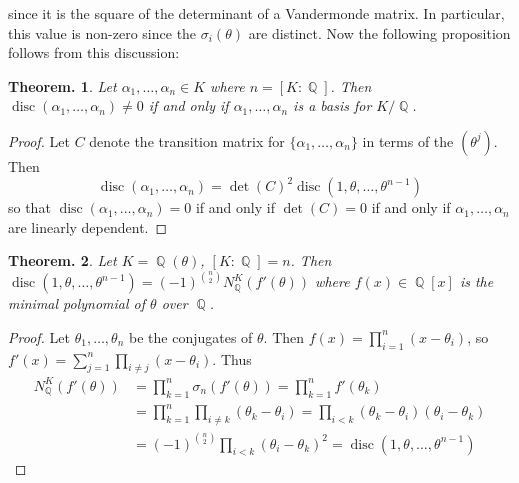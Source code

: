 \documentclass[11pt, a4paper]{memoir}
\DeclareMathOperator{\Q}{{\mathbb{Q}}}
\theoremstyle{change}
\newtheorem{theorem}{Theorem.}[section]
\theoremstyle{plain}
\theoremstyle{nonumberplain}
\newtheorem{proof}{Proof}
\DeclareMathOperator{\disc}{disc}
\begin{document}
since it is the square of the determinant of a Vandermonde matrix.
In particular, this value is non-zero since the $\sigma_i(\theta)$ are distinct.
Now the following proposition follows from this discussion:
\begin{theorem}
    Let $\alpha_1,\ldots,\alpha_n\in K$ where $n=[K:\Q]$.
    Then $\disc(\alpha_1,\ldots,\alpha_n)\neq 0$ if and only if $\alpha_1,\ldots,\alpha_n$ is a basis for $K/\Q$.
\end{theorem}
\begin{proof}
    Let $C$ denote the transition matrix for $\{\alpha_1,\ldots,\alpha_n\}$ in terms of the $(\theta^j)$.
    Then
    \begin{equation*}
        \disc(\alpha_1,\ldots,\alpha_n)=\det(C)^2\disc(1,\theta,\ldots,\theta^{n-1})
    \end{equation*}
    so that $\disc(\alpha_1,\ldots,\alpha_n)=0$ if and only if $\det(C)=0$ if and only if $\alpha_1,\ldots,\alpha_n$ are linearly dependent.
\end{proof}
\begin{theorem}
    Let $K=\Q(\theta)$, $[K:\Q]=n$.
    Then $\disc(1,\theta,\ldots,\theta^{n-1})=(-1)^{\binom{n}{2}}N_{\Q}^K(f'(\theta))$ where $f(x)\in\Q[x]$ is the minimal polynomial of $\theta$ over $\Q$.
\end{theorem}
\begin{proof}
    Let $\theta_1,\ldots,\theta_n$ be the conjugates of $\theta$.
    Then $f(x)=\prod_{i=1}^n(x-\theta_i)$, so $f'(x)=\sum_{j=1}^n\prod_{i\neq j}(x-\theta_i)$.
    Thus
    \begin{align*}
        N_{\Q}^K(f'(\theta))&=\prod_{k=1}^n\sigma_n(f'(\theta)) = \prod_{k=1}^n f'(\theta_k)\\
                            &= \prod_{k=1}^n\prod_{i\neq k}(\theta_k-\theta_i)= \prod_{i<k}(\theta_k-\theta_i)(\theta_i-\theta_k)\\
                            &= (-1)^{\binom{n}{2}}\prod_{i<k}(\theta_i-\theta_k)^2= \disc(1,\theta,\ldots,\theta^{n-1})
    \end{align*}
\end{proof}
\end{document}
